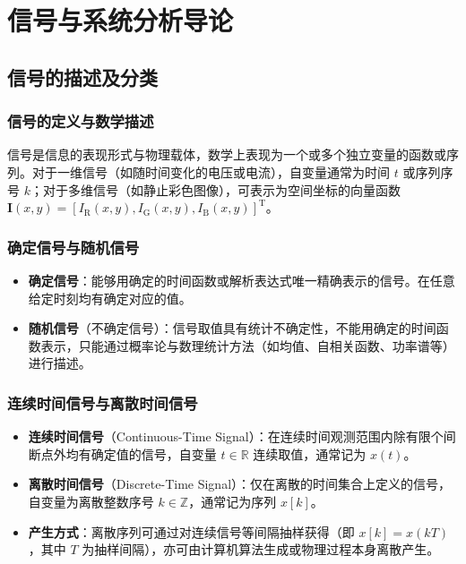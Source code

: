 \documentclass[11pt,a4paper,fontset=fandol]{ctexart}
\theoremstyle{remark}
\begin{document}
\section{信号与系统分析导论}

\subsection{信号的描述及分类}

\subsubsection{信号的定义与数学描述}
信号是信息的表现形式与物理载体，数学上表现为一个或多个独立变量的函数或序列。对于一维信号（如随时间变化的电压或电流），自变量通常为时间 $t$ 或序列序号 $k$；对于多维信号（如静止彩色图像），可表示为空间坐标的向量函数 $\bm{I}(x, y) = [I_{\mathrm{R}}(x, y), I_{\mathrm{G}}(x, y), I_{\mathrm{B}}(x, y)]^{\mathrm{T}}$。

\subsubsection{确定信号与随机信号}
\begin{itemize}
    \item \textbf{确定信号}：能够用确定的时间函数或解析表达式唯一精确表示的信号。在任意给定时刻均有确定对应的值。
    \item \textbf{随机信号}（不确定信号）：信号取值具有统计不确定性，不能用确定的时间函数表示，只能通过概率论与数理统计方法（如均值、自相关函数、功率谱等）进行描述。
\end{itemize}

\subsubsection{连续时间信号与离散时间信号}
\begin{itemize}
    \item \textbf{连续时间信号}（Continuous-Time Signal）：在连续时间观测范围内除有限个间断点外均有确定值的信号，自变量 $t \in \mathbb{R}$ 连续取值，通常记为 $x(t)$。
    \item \textbf{离散时间信号}（Discrete-Time Signal）：仅在离散的时间集合上定义的信号，自变量为离散整数序号 $k \in \mathbb{Z}$，通常记为序列 $x[k]$。
    \item \textbf{产生方式}：离散序列可通过对连续信号等间隔抽样获得（即 $x[k] = x(kT)$，其中 $T$ 为抽样间隔），亦可由计算机算法生成或物理过程本身离散产生。
\end{itemize}
\end{document}
